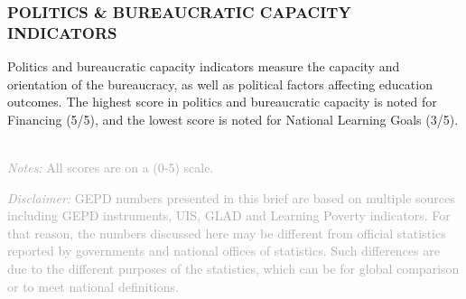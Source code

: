 \documentclass[
  twocolumn]{article}
\begin{document}
\hypertarget{politics-bureaucratic-capacity-indicators}{%
\subsubsection{\texorpdfstring{\textbf{POLITICS \& BUREAUCRATIC CAPACITY
INDICATORS}}{POLITICS \& BUREAUCRATIC CAPACITY INDICATORS}}\label{politics-bureaucratic-capacity-indicators}}

Politics and bureaucratic capacity indicators measure the capacity and
orientation of the bureaucracy, as well as political factors affecting
education outcomes. The highest score in politics and bureaucratic
capacity is noted for Financing (5/5), and the lowest score is noted for
National Learning Goals (3/5).

\begin{table}[H]
\\

    {\scriptsize
    \textcolor{darkgray}{\textit{Notes:} All scores are on a (0-5) scale.}
  }

\end{table}
\raggedbottom

{\scriptsize
    \textcolor{darkgray}{\textit{Disclaimer:} GEPD numbers presented in this brief are based on multiple sources including GEPD instruments, UIS, GLAD and Learning Poverty indicators. For that reason, the numbers discussed here may be different from official statistics reported by governments and national offices of statistics. Such differences are due to the different purposes of the statistics, which can be for global comparison or to meet national definitions.}
  }
\end{document}
